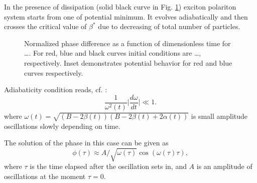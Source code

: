 \documentclass[aps, pre, preprint, groupedaddress, superscriptaddress, showkeys, showpacs] {revtex4-1}
\begin{document}
{In the presence of dissipation (solid black curve in Fig. \ref{pic:phase}) exciton polariton
system starts from one of potential  minimum. It evolves adiabatically and then  crosses the critical value
of $\beta^*$ due to decreasing of total number of particles. 
%
%
%
\begin{figure}[ht]
\caption{Normalized phase difference as a function of dimensionless time for {\red \dots}.
For red, blue and black curves initial conditions are {\red \dots}, respectively. Inset demonstrates potential behavior for red and blue curves respectively.
\label{pic:phase}}
\end{figure}
%
Adiabaticity condition reads, cf. {\red [ ]}:
%
\begin{equation}
\dfrac{1}{\omega^2(t)} \Big| \dfrac{d \omega}{d t} \Big| \ll 1.
\end{equation}
%
where $\omega(t) = \sqrt{(B - 2\beta(t))(B - 2 \beta(t) + 2 \alpha(t))}$ is small amplitude oscillations slowly depending on time. 

%
%
The solution of the phase in this case can be given as 
\begin{equation}
\phi(\tau) \approx A / \sqrt{\omega(\tau)} \cos (\omega(\tau) \tau),
\end{equation}
%
where $\tau$ is the time elapsed after the oscillation sets in, and $A$ is an amplitude of oscillations at the moment $\tau = 0$.

}
\end{document}
